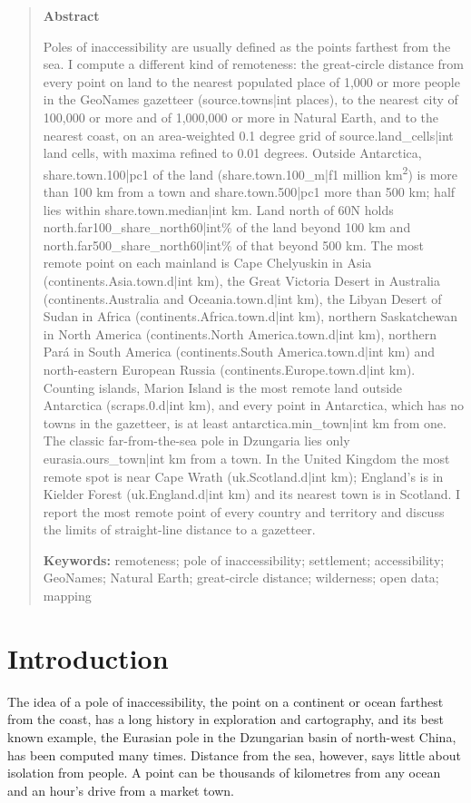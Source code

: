 \documentclass[11pt,a4paper]{article}
\begin{document}
\begin{quote}
\small
\begin{center}\textbf{Abstract}\end{center}
Poles of inaccessibility are usually defined as the points farthest from the sea. I compute a different kind of remoteness: the great-circle distance from every point on land to the nearest populated place of 1,000 or more people in the GeoNames gazetteer ({{source.towns|int}} places), to the nearest city of 100,000 or more and of 1,000,000 or more in Natural Earth, and to the nearest coast, on an area-weighted 0.1 degree grid of {{source.land_cells|int}} land cells, with maxima refined to 0.01 degrees. Outside Antarctica, {{share.town.100|pc1}} of the land ({{share.town.100_m|f1}} million km\textsuperscript{2}) is more than 100 km from a town and {{share.town.500|pc1}} more than 500 km; half lies within {{share.town.median|int}} km. Land north of 60\textdegree N holds {{north.far100_share_north60|int}}\% of the land beyond 100 km and {{north.far500_share_north60|int}}\% of that beyond 500 km. The most remote point on each mainland is Cape Chelyuskin in Asia ({{continents.Asia.town.d|int}} km), the Great Victoria Desert in Australia ({{continents.Australia and Oceania.town.d|int}} km), the Libyan Desert of Sudan in Africa ({{continents.Africa.town.d|int}} km), northern Saskatchewan in North America ({{continents.North America.town.d|int}} km), northern Par\'a in South America ({{continents.South America.town.d|int}} km) and north-eastern European Russia ({{continents.Europe.town.d|int}} km). Counting islands, Marion Island is the most remote land outside Antarctica ({{scraps.0.d|int}} km), and every point in Antarctica, which has no towns in the gazetteer, is at least {{antarctica.min_town|int}} km from one. The classic far-from-the-sea pole in Dzungaria lies only {{eurasia.ours_town|int}} km from a town. In the United Kingdom the most remote spot is near Cape Wrath ({{uk.Scotland.d|int}} km); England's is in Kielder Forest ({{uk.England.d|int}} km) and its nearest town is in Scotland. I report the most remote point of every country and territory and discuss the limits of straight-line distance to a gazetteer.

\textbf{Keywords:} remoteness; pole of inaccessibility; settlement; accessibility; GeoNames; Natural Earth; great-circle distance; wilderness; open data; mapping
\end{quote}

\section{Introduction}
The idea of a pole of inaccessibility, the point on a continent or ocean farthest from the coast, has a long history in exploration and cartography, and its best known example, the Eurasian pole in the Dzungarian basin of north-west China, has been computed many times. Distance from the sea, however, says little about isolation from people. A point can be thousands of kilometres from any ocean and an hour's drive from a market town.
\end{document}
